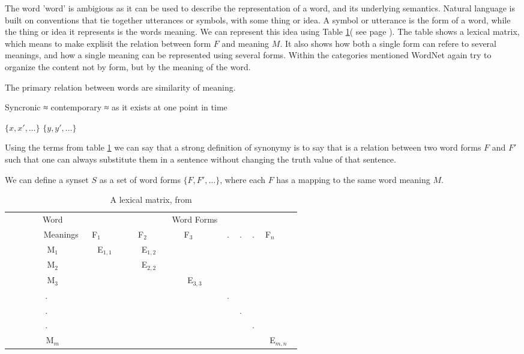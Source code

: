 The word 'word' is ambigious as it can be used to describe the representation of a word, and its underlying semantics.
Natural language is built on conventions that tie together utterances or symbols, with some thing or idea.
A symbol or utterance is the form of a word, while the thing or idea it represents is the words meaning.
We can represent this idea using Table \ref{table:LexicalMatrix}( see page \pageref{table:LexicalMatrix}).
The table shows a lexical matrix, which means to make explisit the relation between form $F$ and meaning  $M$.
It also shows how both a single form can refere to several meanings, 
and how a single meaning can be represented using several forms.
Within the categories mentioned WordNet again try to organize the content not by form, 
but by the meaning of the word.


The primary relation between words are similarity of meaning.

Syncronic ≈ contemporary ≈ as it exists at one point in time

$\{x,x',\dots\}$ $\{y,y',\dots\}$

Using the terms from table \ref{table:LexicalMatrix} we can say that a strong definition of synonymy is to say that is 
a relation between two word forms $F$ and $F'$ such that one can always substitute them in a sentence without changing the truth value of 
that sentence.

We can define a synset $S$ as a set of word forms $\{F,F',\dots\}$, 
where each $F$ has a mapping to the same word meaning $M$.
\begin{table}[ht]
	\centering
	\begin{tabular}{|c||ccccccc|}
		\hline
	        Word     & 	~		 & ~		 & Word Forms & ~ & ~ & ~ & ~		  \\ 
	        Meanings & F$_1$     & F$_2$     & F$_3$      & . & . & . & F$_n$     \\ \hline
	        M$_1$    & E$_{1,1}$ & E$_{1,2}$ & ~          & ~ & ~ & ~ & ~         \\ 
	        M$_2$    & ~         & E$_{2,2}$ & ~          & ~ & ~ & ~ & ~         \\ 
	        M$_3$    & ~         & ~         & E$_{3,3}$  & ~ & ~ & ~ & ~         \\ 
	        .        & ~         & ~         & ~          & . & ~ & ~ & ~         \\ 
	        .        & ~         & ~         & ~          & ~ & . & ~ & ~         \\ 
	        .        & ~         & ~         & ~          & ~ & ~ & . & ~         \\  
	        M$_m$    & ~         & ~         & ~          & ~ & ~ & ~ & E$_{m,n}$ \\
		\hline
	\end{tabular}
	\caption{A lexical matrix, from \citet{Miller1990}}
	\label{table:LexicalMatrix}
\end{table}


	
